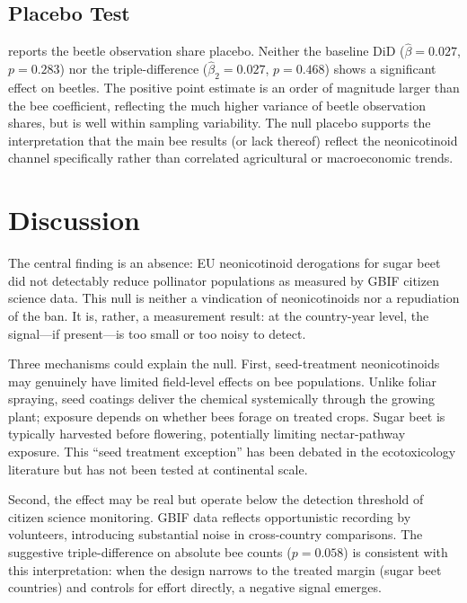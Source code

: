 \documentclass[12pt]{article}
\begin{document}
\subsection{Placebo Test}



 reports the beetle observation share placebo. Neither the baseline DiD ($\hat{\beta} = 0.027$, $p = 0.283$) nor the triple-difference ($\hat{\beta}_2 = 0.027$, $p = 0.468$) shows a significant effect on beetles. The positive point estimate is an order of magnitude larger than the bee coefficient, reflecting the much higher variance of beetle observation shares, but is well within sampling variability. The null placebo supports the interpretation that the main bee results (or lack thereof) reflect the neonicotinoid channel specifically rather than correlated agricultural or macroeconomic trends.

\section{Discussion}
\label{sec:discussion}

The central finding is an absence: EU neonicotinoid derogations for sugar beet did not detectably reduce pollinator populations as measured by GBIF citizen science data. This null is neither a vindication of neonicotinoids nor a repudiation of the ban. It is, rather, a measurement result: at the country-year level, the signal---if present---is too small or too noisy to detect.

Three mechanisms could explain the null. First, seed-treatment neonicotinoids may genuinely have limited field-level effects on bee populations. Unlike foliar spraying, seed coatings deliver the chemical systemically through the growing plant; exposure depends on whether bees forage on treated crops. Sugar beet is typically harvested before flowering, potentially limiting nectar-pathway exposure. This ``seed treatment exception'' has been debated in the ecotoxicology literature \citep{rundlof2015, woodcock2017} but has not been tested at continental scale.

Second, the effect may be real but operate below the detection threshold of citizen science monitoring. GBIF data reflects opportunistic recording by volunteers, introducing substantial noise in cross-country comparisons. The suggestive triple-difference on absolute bee counts ($p = 0.058$) is consistent with this interpretation: when the design narrows to the treated margin (sugar beet countries) and controls for effort directly, a negative signal emerges.
\end{document}
